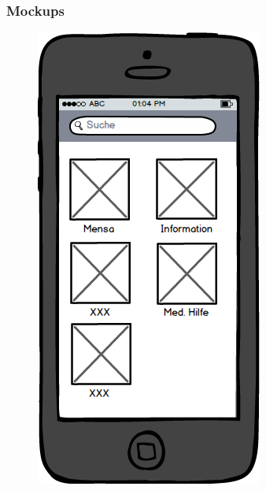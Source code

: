 \subsubsection*{Mockups}
\begin{figure}[ht]
\centering
\begin{minipage}[b]{.5\textwidth}
  \centering
  \includegraphics[width=.8\linewidth]{img/menu-mockup.png}
  \label{img:menu-mockup}
\end{minipage}%
\begin{minipage}[b]{.5\textwidth}
  \centering

\end{minipage}
\end{figure}
